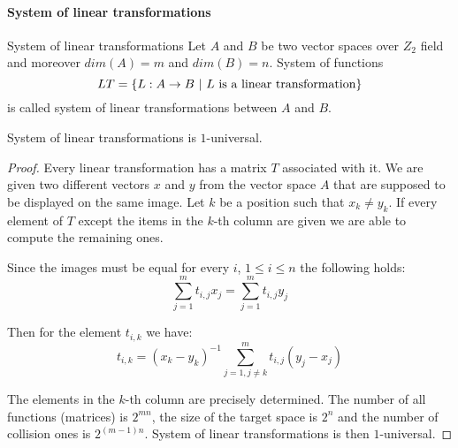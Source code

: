\paragraph{System of linear transformations}
\begin{definition}{System of linear transformations}
Let $A$ and $B$ be two vector spaces over $Z_2$ field and moreover $dim(A) = m$ and $dim(B) = n$. System of functions \[ LT = \{L : A \rightarrow B \ | \  L \text{ is a linear transformation}\} \] is called system of linear transformations between $A$ and $B$.
\end{definition}
\begin{remark}
System of linear transformations is $1$-universal.
\end{remark}
\begin{proof}
Every linear transformation has a matrix $T$ associated with it. We are given two different vectors $x$ and $y$ from the vector space $A$ that are supposed to be displayed on the same image. Let $k$ be a position such that $x_k \neq y_k$. If every element of $T$ except the items in the $k$-th column are given we are able to compute the remaining ones. 

Since the images must be equal for every $i$, $1 \leq i \leq n$ the following holds:
\[
\displaystyle\sum_{j = 1}^{m}t_{i, j}x_j = \displaystyle\sum_{j = 1}^{m}t_{i, j}y_j
\]

Then for the element $t_{i, k}$ we have:
\[
t_{i, k} = (x_k - y_k)^{-1}\displaystyle\sum_{j = 1, j \neq k}^{m}t_{i, j}(y_j - x_j)
\]

The elements in the $k$-th column are precisely determined. The number of all functions (matrices) is $2^{mn}$, the size of the target space is $2^n$ and the number of collision ones is $2^{(m-1)n}$. System of linear transformations is then $1$-universal.
\end{proof}

